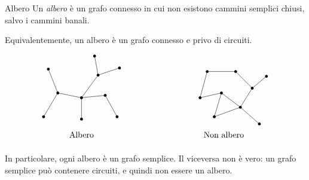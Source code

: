 \documentclass[a4paper]{article}
\begin{document}
\begin{snippetdefinition}{Albero}
    Un \emph{albero} è un grafo connesso in cui non esistono cammini semplici chiusi, salvo i cammini banali.

    Equivalentemente, un albero è un grafo connesso e privo di circuiti.
\end{snippetdefinition}

\[
    \begin{tikzpicture}[scale=1]
        \begin{scope}
            \node at (0,-1.55) {Albero};

            \coordinate (a) at (0,0);
            \coordinate (b) at (-1,0.2);
            \coordinate (c) at (-1.4,1.2);
            \coordinate (d) at (-1.6,-0.8);
            \coordinate (e) at (0,-0.9);
            \coordinate (f) at (1,0.1);
            \coordinate (g) at (1.5,-0.8);
            \coordinate (h) at (0.7,0.95);
            \coordinate (i) at (1.6,1.25);
            \coordinate (j) at (0.55,1.75);

            \draw (a)--(b)--(c);
            \draw (b)--(d);
            \draw (a)--(e);
            \draw (a)--(f)--(g);
            \draw (a)--(h)--(i);
            \draw (h)--(j);

            \foreach \p in {a,b,c,d,e,f,g,h,i,j}{
                \fill (\p) circle (1.7pt);
            }
        \end{scope}

        \begin{scope}[xshift=6cm]
            \node at (0,-1.55) {Non albero};

            \coordinate (a) at (-1,0);
            \coordinate (b) at (-0.7,1.1);
            \coordinate (c) at (0.5,1.1);
            \coordinate (d) at (1.2,0.4);
            \coordinate (e) at (0.7,-0.4);
            \coordinate (f) at (-0.1,0.2);
            \coordinate (g) at (-0.4,-0.8);
            \coordinate (h) at (1.8,0.9);
            \coordinate (i) at (1.5,-1.1);

            \draw (a)--(b)--(c)--(d)--(e)--(f)--(a);
            \draw (f)--(g)--(e);
            \draw (d)--(h);
            \draw (e)--(i);

            \foreach \p in {a,b,c,d,e,f,g,h,i}{
                \fill (\p) circle (1.7pt);
            }
        \end{scope}
    \end{tikzpicture}
\]

In particolare, ogni albero è un grafo semplice. Il viceversa non è vero: un grafo semplice può contenere circuiti, e quindi non essere un albero.
\end{document}
